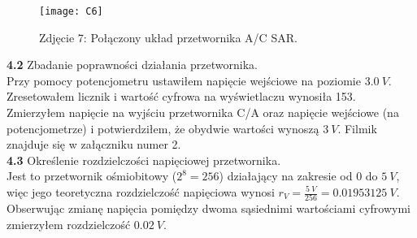 \documentclass[14pt, table]{extarticle}
\begin{document}
\begin{figure}[H]
\texttt{[image: C6]}
\centering
\captionsetup{labelformat=empty}
\caption{Zdjęcie 7: Połączony układ przetwornika A/C SAR.}
\end{figure}

\newpage
\textbf{4.2} Zbadanie poprawności działania przetwornika. \\

Przy pomocy potencjometru ustawiłem napięcie wejściowe na poziomie $3.0 \ V$. Zresetowałem licznik i wartość cyfrowa na wyświetlaczu wynosiła 153. Zmierzyłem napięcie na wyjściu przetwornika C/A oraz napięcie wejściowe (na potencjometrze) i potwierdziłem, że obydwie wartości wynoszą $3 \ V$. Filmik znajduje się w załączniku numer 2.\\

\textbf{4.3} Określenie rozdzielczości napięciowej przetwornika. \\

Jest to przetwornik ośmiobitowy ($2^8 = 256$) działający na zakresie od $0$ do $5 \ V$, więc jego teoretyczna rozdzielczość napięciowa wynosi $r_V = \frac{5 \ V}{256} = 0.01953125 \ V$. Obserwując zmianę napięcia pomiędzy dwoma sąsiednimi wartościami cyfrowymi zmierzyłem rozdzielczość $0.02 \ V$.
\end{document}
